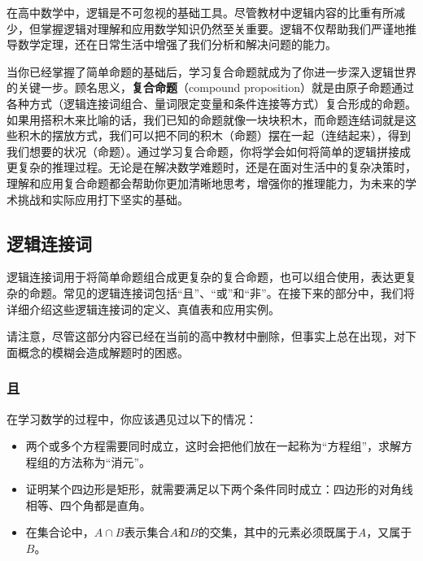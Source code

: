 
\begin{issues}
\issueDraft
\end{issues}


在高中数学中，逻辑是不可忽视的基础工具。尽管教材中逻辑内容的比重有所减少，但掌握逻辑对理解和应用数学知识仍然至关重要。逻辑不仅帮助我们严谨地推导数学定理，还在日常生活中增强了我们分析和解决问题的能力。

当你已经掌握了简单命题的基础后，学习复合命题就成为了你进一步深入逻辑世界的关键一步。顾名思义，\textbf{复合命题}（compound proposition）就是由原子命题通过各种方式（逻辑连接词组合、量词限定变量和条件连接等方式）复合形成的命题。如果用搭积木来比喻的话，我们已知的命题就像一块块积木，而命题连结词就是这些积木的摆放方式，我们可以把不同的积木（命题）摆在一起（连结起来），得到我们想要的状况（命题）。通过学习复合命题，你将学会如何将简单的逻辑拼接成更复杂的推理过程。无论是在解决数学难题时，还是在面对生活中的复杂决策时，理解和应用复合命题都会帮助你更加清晰地思考，增强你的推理能力，为未来的学术挑战和实际应用打下坚实的基础。

\subsection{逻辑连接词}

逻辑连接词用于将简单命题组合成更复杂的复合命题，也可以组合使用，表达更复杂的命题。常见的逻辑连接词包括“且”、“或”和“非”。在接下来的部分中，我们将详细介绍这些逻辑连接词的定义、真值表和应用实例。

请注意，尽管这部分内容已经在当前的高中教材中删除，但事实上总在出现，对下面概念的模糊会造成解题时的困惑。

\subsubsection{且}

在学习数学的过程中，你应该遇见过以下的情况：
\begin{itemize}
\item 两个或多个方程需要同时成立，这时会把他们放在一起称为“方程组”，求解方程组的方法称为“消元”。
\item 证明某个四边形是矩形，就需要满足以下两个条件同时成立：四边形的对角线相等、四个角都是直角。
\item 在集合论中，$A \cap B$表示集合$A$和$B$的交集，其中的元素必须既属于$A$，又属于$B$。
\end{itemize}

